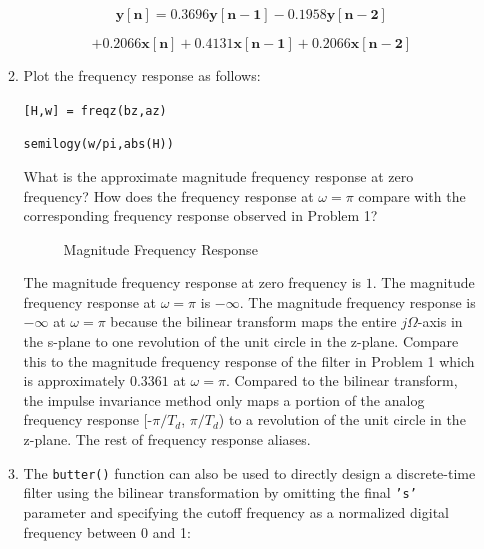 \documentclass[fleqn]{article}
\begin{document}
\begin{enumerate}[nolistsep]
\begin{enumerate}
			\begin{equation*}
				\mathbf{y[n] = 0.3696y[n-1] - 0.1958y[n-2]}
			\end{equation*}
			
			\begin{equation*}
				\mathbf{+ 0.2066x[n] + 0.4131x[n-1] + 0.2066x[n-2]}
			\end{equation*}
			
			\pagebreak
			\item Plot the frequency response as follows:
			
			\texttt{[H,w] = freqz(bz,az)}
			
			\texttt{semilogy(w/pi,abs(H))}
			
			What is the approximate magnitude frequency response at zero frequency? How does the frequency response at $\omega = \pi$ compare with the corresponding frequency response observed in Problem 1?
			
			\begin{figure}[H]
					\centerline{}
					\caption{Magnitude Frequency Response}
			\end{figure}
			
			The magnitude frequency response at zero frequency is $1$. The magnitude frequency response at $\omega = \pi$ is $-\infty$. The magnitude frequency response is $-\infty$ at $\omega=\pi$ because the bilinear transform maps the entire $j\Omega$-axis in the s-plane to one revolution of the unit circle in the z-plane. Compare this to the magnitude frequency response of the filter in Problem 1 which is approximately $0.3361$ at $\omega = \pi$. Compared to the bilinear transform, the impulse invariance method only maps a portion of the analog frequency response [-$\pi/T_d$, $\pi/T_d$) to a revolution of the unit circle in the z-plane. The rest of frequency response aliases.
			
			\item The \texttt{butter()} function can also be used to directly design a discrete-time filter using the bilinear transformation by omitting the final \texttt{'s'} parameter and specifying the cutoff frequency as a normalized digital frequency between 0 and 1:
			

\end{enumerate}
\end{enumerate}
\end{document}
